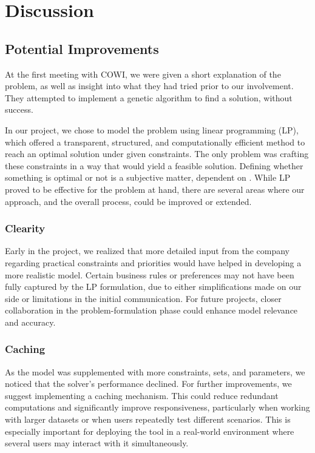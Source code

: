 \documentclass{article}
\begin{document}
\section{Discussion}

\subsection{Potential Improvements}
At the first meeting with COWI, we were given a short explanation of the problem, as well as insight 
into what they had tried prior to our involvement. They attempted to implement a genetic algorithm 
to find a solution, without success.

In our project, we chose to model the problem using linear programming (LP), which offered a transparent, 
structured, and computationally efficient method to reach an optimal solution under given constraints. The 
only problem was crafting these constraints in a way that would yield a feasible solution. Defining whether something 
is optimal or not is a subjective matter, dependent on . While LP proved to 
be effective for the problem at hand, there are several areas where our approach, and the overall process, could be 
improved or extended. 

\subsubsection{Clearity}
Early in the project, we realized that more detailed input from the company regarding practical constraints 
and priorities would have helped in developing a more realistic model. Certain business rules or preferences 
may not have been fully captured by the LP formulation, due to either simplifications made on our side or 
limitations in the initial communication. For future projects, closer collaboration in the problem-formulation 
phase could enhance model relevance and accuracy.

\subsubsection{Caching}
As the model was supplemented with more constraints, sets, and parameters, we noticed that the solver's performance 
declined. For further improvements, we suggest implementing a caching mechanism. This could reduce redundant computations 
and significantly improve responsiveness, particularly when working with larger datasets or when users repeatedly 
test different scenarios. This is especially important for deploying the tool in a real-world environment where several 
users may interact with it simultaneously.
\end{document}
